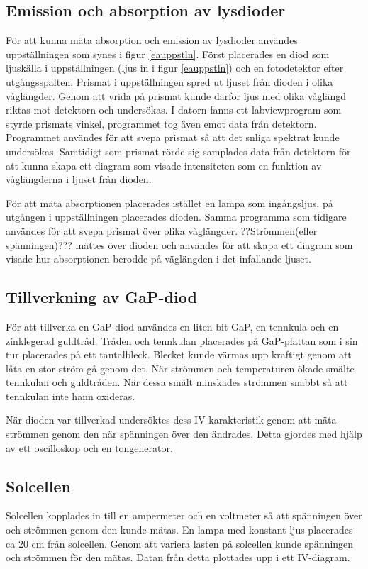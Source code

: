 \documentclass[a4paper]{article}
\begin{document}
\subsection{Emission och absorption av lysdioder}
För att kunna mäta absorption och emission av lysdioder användes uppställningen som synes i figur \ref{eauppstln}. Först placerades en diod som ljuskälla i uppställningen (ljus in i figur \ref{eauppstln}) och en fotodetektor efter utgångsspalten. Prismat i uppställningen spred ut ljuset från dioden i olika våglängder. Genom att vrida på prismat kunde därför ljus med olika våglängd riktas mot detektorn och undersökas. I datorn fanns ett labviewprogram som styrde prismats vinkel, programmet tog även emot data från detektorn. Programmet användes för att svepa prismat så att det snliga spektrat kunde undersökas. Samtidigt som prismat rörde sig samplades data från detektorn för att kunna skapa ett diagram som visade intensiteten som en funktion av våglängderna i ljuset från dioden. 

För att mäta absorptionen placerades istället en lampa som ingångsljus, på utgången i uppställningen placerades dioden. Samma programma som tidigare användes för att svepa prismat över olika våglängder. ??Strömmen(eller spänningen)??? mättes över dioden och användes för att skapa ett diagram som visade hur absorptionen berodde på väglängden i det infallande ljuset. 

\subsection{Tillverkning av GaP-diod}
För att tillverka en GaP-diod användes en liten bit GaP, en tennkula och en zinklegerad guldtråd. Tråden och tennkulan placerades på GaP-plattan som i sin tur placerades på ett tantalbleck. Blecket kunde värmas upp kraftigt genom att låta en stor ström gå genom det. När strömmen och temperaturen ökade smälte tennkulan och guldtråden. När dessa smält minskades strömmen snabbt så att tennkulan inte hann oxideras.

När dioden var tillverkad undersöktes dess IV-karakteristik genom att mäta strömmen genom den när spänningen över den ändrades. Detta gjordes med hjälp av ett oscilloskop och en tongenerator. 

\subsection{Solcellen}
Solcellen kopplades in till en ampermeter och en voltmeter så att spänningen över och strömmen genom den kunde mätas. En lampa med konstant ljus placerades ca 20 cm från solcellen. Genom att variera lasten på solcellen kunde spänningen och strömmen för den mätas. Datan från detta plottades upp i ett IV-diagram.
\end{document}
